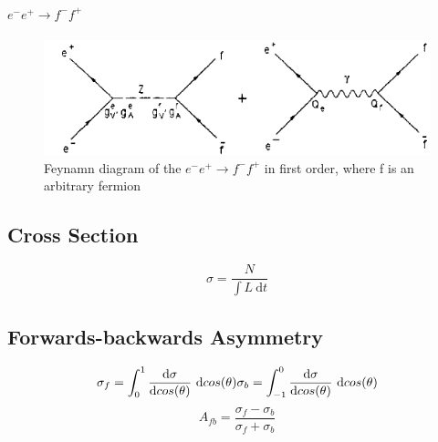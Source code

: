 \paragraph{$e^-e^+ \rightarrow f^-f^+$}
\begin{figure}[hb]
	\centering
	\includegraphics{graphics/annihilation.png}
	\caption{Feynamn diagram of the $e^-e^+ \rightarrow f^-f^+$ in first order, where f is an arbitrary fermion}
\end{figure}

\subsection{Cross Section}
\begin{equation}
\sigma = \frac{N}{\int L~\text{d}t}
\end{equation}

\subsection{Forwards-backwards Asymmetry}
\begin{equation}
\sigma_f=\int_{0}^{1}\frac{\text{d}\sigma}{\text{d}cos(\theta)}~\text{d}cos(\theta) \\
\sigma_b=\int_{-1}^{0}\frac{\text{d}\sigma}{\text{d}cos(\theta)}~\text{d}cos(\theta)
\end{equation}
\begin{equation}
A_{fb}=\frac{\sigma_f-\sigma_b}{\sigma_f+\sigma_b}
\end{equation}
